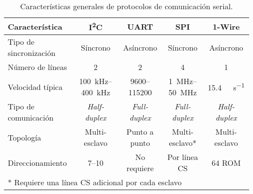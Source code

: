 \begin{table}[h]
	\small
	\centering
	\caption{Características generales de protocolos de comunicación serial.}
\begin{tabular}{p{2.5cm}cccc}
	\toprule
	\textbf{Característica} & \textbf{I\textsuperscript{2}C} & \textbf{UART} & \textbf{SPI} & \textbf{1-Wire} \\
	\midrule
	Tipo de sincronización & Síncrono & Asíncrono & Síncrono & Asíncrono \\
	Número de líneas & 2 & 2 & 4 & 1 \\
	Velocidad típica & \SIrange{100}{400}{\kilo\hertz} & \SIrange{9600}{115200}{\baud} & \SIrange{1}{50}{\mega\hertz} & \SI{15.4}{\kilo\bit\per\second} \\
	Tipo de comunicación & \textit{Half-duplex} & \textit{Full-duplex} & \textit{Full-duplex} & \textit{Half-duplex} \\
	Topología & Multi-esclavo & Punto a punto & Multi-esclavo* & Multi-esclavo \\
	Direccionamiento & \SIrange{7}{10}{\bit} & No requiere & Por línea CS & \SI{64}{\bit} ROM \\
	\bottomrule
	\multicolumn{5}{l}{\small{* Requiere una línea CS adicional por cada esclavo}} \\
\end{tabular}
	\label{table:protocolos_general}
\end{table}




